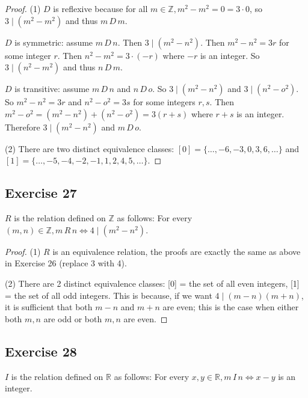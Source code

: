 \documentclass[14pt]{extarticle}
\newcommand{\R}{\mathbb{R}}
\newcommand{\Z}{\mathbb{Z}}
\begin{document}
\begin{proof}
        (1) \(D\) is reflexive because for all \(m \in \Z, m^2 - m^2 = 0 = 3 \cdot 0\), so \(3 \mid (m^2-m^2)\) and thus
        \(m \,D\, m\).

        \(D\) is symmetric: assume \(m \,D\, n\). Then \(3 \mid (m^2 - n^2)\). Then \(m^2-n^2 = 3r\) for some integer $r$.
        Then \(n^2-m^2 = 3\cdot(-r)\) where $-r$ is an integer. So \(3 \mid (n^2-m^2)\) and thus \(n \,D\, m\).

        \(D\) is transitive: assume \(m \,D\, n\) and \(n \,D\, o\). So \(3 \mid (m^2-n^2)\) and \(3 \mid (n^2-o^2)\). So
        \(m^2-n^2 = 3r\) and \(n^2-o^2 = 3s\) for some integers $r,s$. Then \(m^2-o^2 = (m^2-n^2)+(n^2-o^2) = 3(r+s)\)
        where $r+s$ is an integer. Therefore \(3 \mid (m^2-n^2)\) and \(m \,D\, o\).

        (2) There are two distinct equivalence classes: \([0] = \{\ldots, -6, -3, 0, 3, 6, \ldots\}\) and
        \([1] = \{\ldots, -5, -4, -2, -1, 1, 2, 4, 5, \ldots\}\).
\end{proof}

\subsection{Exercise 27}
\(R\) is the relation defined on \(\Z\) as follows: For every \((m, n) \in \Z, m \,R\, n \iff 4 \mid (m^2 - n^2)\).

\begin{proof}
        (1) $R$ is an equivalence relation, the proofs are exactly the same as above in Exercise 26 (replace 3 with 4).

        (2) There are 2 distinct equivalence classes: [0] = the set of all even integers, [1] = the set of all odd integers.
        This is because, if we want \(4 \mid (m-n)(m+n)\), it is sufficient that both \(m-n\) and \(m+n\) are even; this is
        the case when either both $m,n$ are odd or both $m,n$ are even.
\end{proof}

\subsection{Exercise 28}
$I$ is the relation defined on $\R$ as follows: For every \(x, y \in \R, m \,I\, n \iff x - y\) is an integer.
\end{document}
